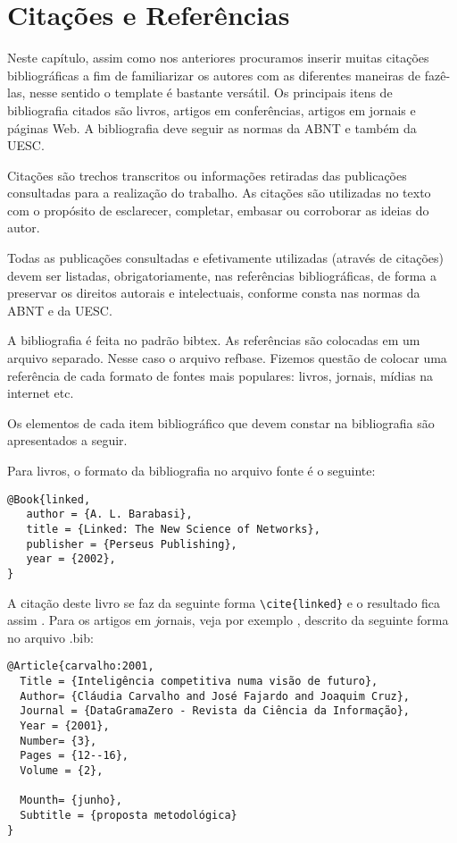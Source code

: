 %
% 
%

\chapter{Citações e Referências}\label{referencias}
Neste capítulo, assim como nos anteriores procuramos inserir muitas citações bibliográficas a fim de familiarizar os autores com as diferentes maneiras de fazê-las, nesse sentido o template é bastante versátil. Os principais itens de bibliografia citados são livros, artigos em conferências,
artigos em jornais e páginas Web. A bibliografia deve seguir as normas da ABNT e também da UESC.

Citações são trechos transcritos ou informações retiradas das publicações consultadas para a realização do trabalho.
As citações são utilizadas no texto com o propósito de esclarecer, completar, embasar ou corroborar as ideias do autor.

Todas as publicações consultadas e efetivamente utilizadas (através de citações) devem ser listadas, obrigatoriamente, nas referências bibliográficas, de forma a preservar os direitos autorais e intelectuais, conforme consta nas normas da ABNT e da UESC.

A bibliografia é feita no padrão {\ttfamily bibtex}. As referências são colocadas em um arquivo separado. Nesse caso o arquivo  {\ttfamily refbase}. Fizemos questão de colocar uma referência de cada formato de fontes mais populares: livros, jornais, mídias na internet etc.

Os elementos de cada item bibliográfico que devem constar na bibliografia são apresentados a seguir.

Para livros, o formato da bibliografia no arquivo fonte é o seguinte:

\begin{verbatim}
@Book{linked,
   author = {A. L. Barabasi},
   title = {Linked: The New Science of Networks},
   publisher = {Perseus Publishing},
   year = {2002},
}
\end{verbatim}

A citação deste livro se faz da seguinte forma \verb#\cite{linked}# e o resultado fica assim \cite{linked}.
Para os artigos em {\textit jornais}, veja por exemplo \cite{carvalho:2001},
descrito da seguinte forma no arquivo {\ttfamily .bib}:

\begin{verbatim}
@Article{carvalho:2001,
  Title = {Inteligência competitiva numa visão de futuro},
  Author= {Cláudia Carvalho and José Fajardo and Joaquim Cruz},
  Journal = {DataGramaZero - Revista da Ciência da Informação},
  Year = {2001},
  Number= {3},
  Pages = {12--16},
  Volume = {2},

  Mounth= {junho},
  Subtitle = {proposta metodológica}
}
\end{verbatim}


